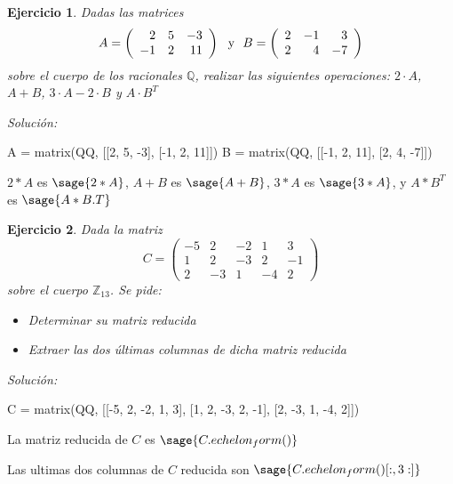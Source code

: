 \documentclass{amsart}
\newtheorem{ejer}{Ejercicio}
\def\z{\mathbb{Z}}
\def\q{\mathbb{Q}}
\begin{document}
\begin{ejer}
Dadas las matrices 
\[ A =
	\left( \begin{array}{rrr}
		2 & 5 & -3 \\
		-1 & 2 & 11
	\end{array}
	\right) \ \ \hbox{y} \ \   B =
	\left( \begin{array}{rrr}
		2 & -1 & 3 \\
		2 & 4 & -7
	\end{array}
	\right) 
	\]
sobre el cuerpo de los racionales $\q$, realizar las siguientes operaciones: $2\cdot A$, $A+B$, $3\cdot A -2\cdot B$ y $A\cdot B^T$

\end{ejer}
{\it Soluci\'on:}

\begin{sageblock}
A = matrix(QQ, [[2, 5, -3], [-1, 2, 11]])
B = matrix(QQ, [[-1, 2, 11], [2, 4, -7]])
\end{sageblock}

$2 * A$ es $\sage{2 * A}$, $A + B$ es $\sage{A + B}$, $3 * A$ es $\sage{3 * A}$, y $A * B^T$ es $\sage{A * B.T}$


\begin{ejer}
Dada la matriz 
\[ C =
	\left( \begin{array}{rrrrr}
		-5 & 2 & -2  & 1 & 3 \\
		1 & 2 & -3 & 2 & -1 \\ 
		2 & -3 & 1 & -4 & 2
	\end{array}
	\right) \]
sobre el cuerpo $\z _{13}$. Se pide:
\begin{itemize}
\item Determinar su matriz reducida
\item Extraer las dos últimas columnas de dicha matriz reducida
\end{itemize}	
\end{ejer}
{\it Soluci\'on:}

\begin{sageblock}
	C = matrix(QQ, [[-5, 2, -2, 1, 3], [1, 2, -3, 2, -1], [2, -3, 1, -4, 2]])
\end{sageblock}

La matriz reducida de $C$ es $\sage{C.echelon_form()}$

Las ultimas dos columnas de $C$ reducida son $\sage{C.echelon_form()[:, 3:]}$

\end{document}
